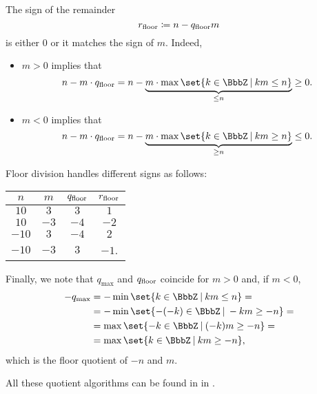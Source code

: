 \begin{remark}
\begin{thmenum}
    The sign of the remainder
    \begin{equation*}
      r_{\operatorname{floor}} \coloneqq n - q_{\operatorname{floor}} m
    \end{equation*}
    is either \( 0 \) or it matches the sign of \( m \). Indeed,
    \begin{itemize}
      \item \( m > 0 \) implies that
      \begin{equation*}
        n - m \cdot q_{\floor}
        =
        n - \underbrace{m \cdot \max\set{ k \in \BbbZ \given km \leq n }}_{\leq n}
        \geq
        0.
      \end{equation*}

      \item \( m < 0 \) implies that
      \begin{equation*}
        n - m \cdot q_{\floor}
        =
        n - \underbrace{m \cdot \max\set{ k \in \BbbZ \given km \geq n }}_{\geq n}
        \leq
        0.
      \end{equation*}
    \end{itemize}

    Floor division handles different signs as follows:
    \begin{center}
      \begin{tabular}{c c c c}
        \( n \)   & \( m \)  & \( q_{\operatorname{floor}} \) & \( r_{\operatorname{floor}} \) \\
        \hline
        \( 10 \)  & \( 3 \)  & \( 3 \)             & \( 1 \) \\
        \( 10 \)  & \( -3 \) & \( -4 \)            & \( -2 \) \\
        \( -10 \) & \( 3 \)  & \( -4 \)            & \( 2 \) \\
        \( -10 \) & \( -3 \) & \( 3 \)             & \( -1 \).
      \end{tabular}
    \end{center}

    Finally, we note that \( q_{\max} \) and \( q_{\operatorname{floor}} \) coincide for \( m > 0 \) and, if \( m < 0 \),
    \begin{align*}
      -q_{\max}
      &=
      -\min\set{ k \in \BbbZ \given km \leq n }
      = \\ &=
      -\min\set{ -(-k) \in \BbbZ \given -km \geq -n }
      = \\ &=
      \max\set{ -k \in \BbbZ \given (-k)m \geq -n }
      = \\ &=
      \max\set{ k \in \BbbZ \given km \geq -n },
    \end{align*}
    which is the floor quotient of \( -n \) and \( m \).
  \end{thmenum}
\end{remark}
\begin{comments}
  \item All these quotient algorithms can be found in  in \cite{code}.
\end{comments}

